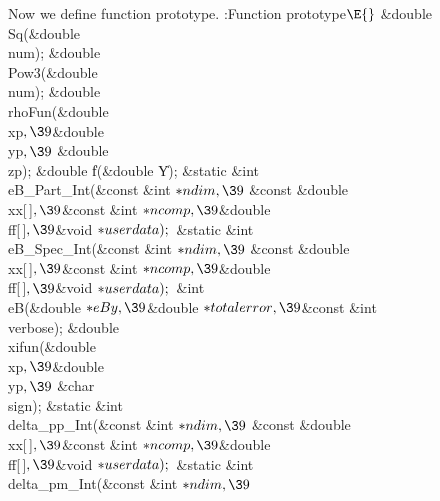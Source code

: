 \documentclass{cweb}
\begin{document}
Now we define function prototype.
\Y\B\4:Function prototype\X${}\E{}$\6
\&{double} \\{Sq}(\&{double} \\{num});\6
\&{double} \\{Pow3}(\&{double} \\{num});\6
\&{double} \\{rhoFun}(\&{double} \\{xp}${},\39{}$\&{double} \\{yp}${},\39{}$%
\&{double} \\{zp});\6
\&{double} \|f(\&{double} \|Y);\6
\&{static} \&{int} \\{eB\_Part\_Int}(\&{const} \&{int} ${}{*}\\{ndim},\39{}$%
\&{const} \&{double} \\{xx}[\,]${},\39{}$\&{const} \&{int} ${}{*}\\{ncomp},%
\39{}$\&{double} \\{ff}[\,]${},\39{}$\&{void} ${}{*}\\{userdata});{}$\6
\&{static} \&{int} \\{eB\_Spec\_Int}(\&{const} \&{int} ${}{*}\\{ndim},\39{}$%
\&{const} \&{double} \\{xx}[\,]${},\39{}$\&{const} \&{int} ${}{*}\\{ncomp},%
\39{}$\&{double} \\{ff}[\,]${},\39{}$\&{void} ${}{*}\\{userdata});{}$\6
\&{int} \\{eB}(\&{double} ${}{*}\\{eBy},\39{}$\&{double} ${}{*}\\{totalerror},%
\39{}$\&{const} \&{int} \\{verbose});\6
\&{double} \\{xifun}(\&{double} \\{xp}${},\39{}$\&{double} \\{yp}${},\39{}$%
\&{char} \\{sign});\6
\&{static} \&{int} \\{delta\_pp\_Int}(\&{const} \&{int} ${}{*}\\{ndim},\39{}$%
\&{const} \&{double} \\{xx}[\,]${},\39{}$\&{const} \&{int} ${}{*}\\{ncomp},%
\39{}$\&{double} \\{ff}[\,]${},\39{}$\&{void} ${}{*}\\{userdata});{}$\6
\&{static} \&{int} \\{delta\_pm\_Int}(\&{const} \&{int} ${}{*}\\{ndim},\39{}$%
\end{document}
